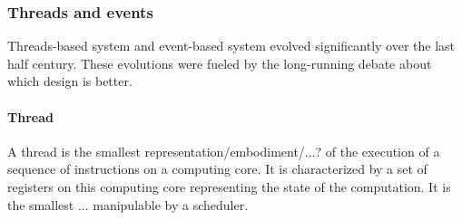 


\subsubsection{Threads and events}



Threads-based system and event-based system evolved significantly over the last half century.
These evolutions were fueled by the long-running debate about which design is better.

\paragraph{Thread}

A thread is the smallest representation/embodiment/...? of the execution of a sequence of instructions on a computing core.
It is characterized by a set of registers on this computing core representing the state of the computation.
It is the smallest ... manipulable by a scheduler.




